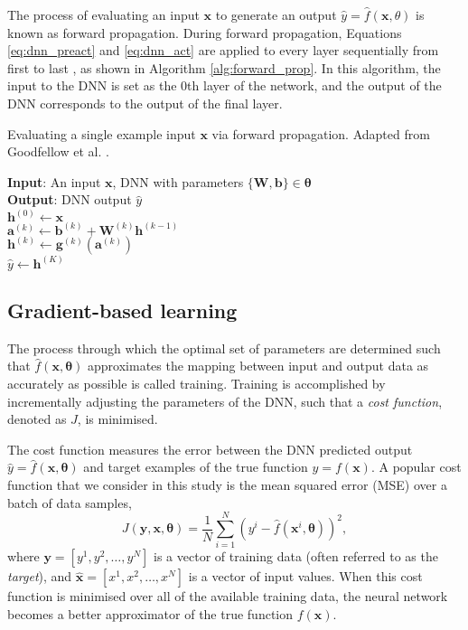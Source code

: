 The process of evaluating an input $\bm{x}$ to generate an output $\hat{y} = \hat{f}(\bm{x},\theta)$ is known as forward propagation.
During forward propagation, Equations \ref{eq:dnn_preact} and \ref{eq:dnn_act} are applied to every layer sequentially from first to last \cite{Goodfellow2016}, 
as shown in Algorithm \ref{alg:forward_prop}.
In this algorithm, the input to the DNN is set as the 0th layer of the network, and the output of the DNN corresponds to the output of the final layer.

\begin{algorithm}[htb!]
\caption[Evaluating a single example input via forward propagation]{Evaluating a single example input $\bm{x}$ via forward propagation. Adapted from Goodfellow et al. \cite{Goodfellow2016}.}
\label{alg:forward_prop}
\nonl\textbf{Input}: An input $\bm{x}$, DNN with parameters $\{\mathbf{W,b}\} \in \bm{\theta}$ \\
\nonl\textbf{Output}: DNN output $\hat{y}$ \\
\vspace{0.3cm} 
$\mathbf{h}^{(0)} \leftarrow \bm{x}$ \\
{
    $\mathbf{a}^{(k)} \leftarrow \mathbf{b}^{(k)} + \mathbf{W}^{(k)} \mathbf{h}^{(k-1)}$ \\
    $\mathbf{h}^{(k)} \leftarrow \mathbf{g}^{(k)}(\mathbf{a}^{(k)})$ \\
}
$\hat{y} \leftarrow \mathbf{h}^{(K)}$ \\
\end{algorithm}



\subsection{Gradient-based learning}\label{sec:grad_des}
The process through which the optimal set of parameters are determined such that $\hat{f}(\bm{x}, \bm{\theta})$ approximates the mapping between 
input and output data as accurately as possible is called training.
Training is accomplished by incrementally adjusting the parameters of the DNN, such that a \emph{cost function}, denoted as $J$, is minimised. 

The cost function measures the error between the DNN predicted output $\hat{y} = \hat{f}(\bm{x}, \bm{\theta})$ and target examples of the true function $y = f(\bm{x})$. 
A popular cost  function that we consider in this study is the mean squared error (MSE) over a batch of data samples,
\begin{equation}
    J( \bm{y}, \bm{x}, \bm{\theta}) = \frac{1}{N} \sum_{i=1}^{N} (y^i - \hat{f}(\bm{x}^i, \bm{\theta}))^2,
    \label{eq:cost_function}
\end{equation}
where $\bm{y} = [ y^1, y^2, \ldots , y^N ]$ is a vector of training data (often referred to as the \emph{target}), 
and $\bm{\hat{x}} = [ x^1, x^2, \ldots , x^N ]$ is a vector of input values.
When this cost function is minimised over all of the available training data, the neural network becomes a better approximator of the true function $f(\bm{x})$.


